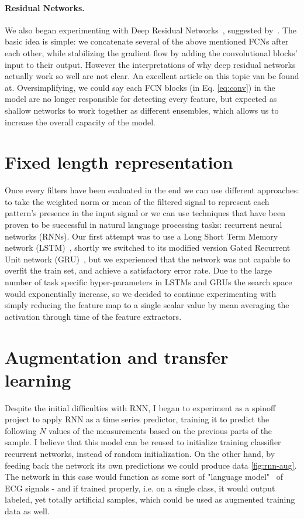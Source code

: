 \paragraph{Residual Networks.}
We also began experimenting with Deep Residual Networks~\cite{he2016deep}, suggested by~\cite{wang2016time}.
The basic idea is simple: we concatenate several of the above mentioned FCNs after each other, while stabilizing the gradient flow by adding the convolutional blocks' input to their output.
However the interpretations of why deep residual networks actually work so well are not clear.
An excellent article on this topic van be found at\cite{resnet-ensembles}.
Oversimplifying, we could say each FCN blocks (in Eq. \ref{eq:conv}) in the model are no longer responsible for detecting every feature, but expected as shallow networks to work together as different ensembles, which allows us to increase the overall capacity of the model.

\section{Fixed length representation}
Once every filters have been evaluated in the end we can use different approaches: to take the weighted norm or mean of the filtered signal to represent each pattern's presence in the input signal or we can use techniques that have been proven to be successful in natural language processing tasks: recurrent neural networks (RNNs).
Our first attempt was to use a Long Short Term Memory network (LSTM)~\cite{hochreiter1997long, malhotra2015long}, shortly we switched to its modified version Gated Recurrent Unit network (GRU)~\cite{chung2014empirical}, but we experienced that the network was not capable to overfit the train set, and achieve a satisfactory error rate.
Due to the large number of task specific hyper-parameters in LSTMs and GRUs the search space would exponentially increase, so we decided to continue experimenting with simply reducing the feature map to a single scalar value by mean averaging the activation through time of the feature extractors.

\section{Augmentation and transfer learning}
Despite the initial difficulties with RNN, I began to experiment as a spinoff project to apply RNN as a time series predictor, training it to predict the following $N$ values of the measurements based on the previous parts of the sample. I believe that this model can be reused to initialize training classifier recurrent networks, instead of random initialization.
On the other hand, by feeding back the network its own predictions we could produce data \ref{fig:rnn-aug}. The network in this case would function as some sort of "language model"~\cite{lang-model} of ECG signals - and if trained properly, i.e. on a single class, it would output labeled, yet totally artificial samples, which could be used as augmented training data as well.

